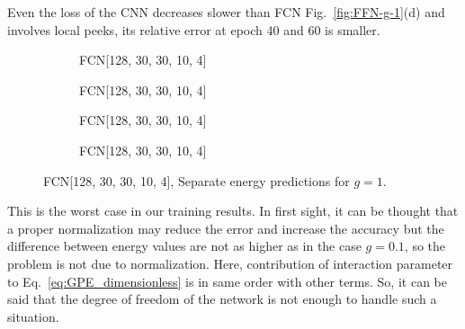 \documentclass[a4paper,times,12pt]{article}
\begin{document}
Even the loss of the CNN decreases slower than FCN Fig.~\ref{fig:FFN-g-1}(d) and involves local peeks, its relative error at epoch 40 and 60 is smaller. 

\begin{figure}[H]
    \centering
    \begin{subfigure}[t]{0.45\textwidth}
		\centering
        
        \caption{FCN[128, 30, 30, 10, 4]}
		\label{fig:a}
    \end{subfigure}
    \begin{subfigure}[t]{0.45\textwidth}
		\centering
        
        \caption{FCN[128, 30, 30, 10, 4]}
		\label{fig:b}
    \end{subfigure}    
    \begin{subfigure}[t]{0.45\textwidth}
        \centering
        
        \caption{FCN[128, 30, 30, 10, 4]}
		\label{fig:c}
    \end{subfigure}
    \begin{subfigure}[t]{0.45\textwidth}
        \centering
        
        \caption{FCN[128, 30, 30, 10, 4]}
		\label{fig:c}
    \end{subfigure}
	\caption{FCN[128, 30, 30, 10, 4], Separate energy predictions for $g = 1$.}
\label{fig:FFN-g-1-S}
\end{figure}

This is the worst case in our training results. In first sight, it can be thought that a proper normalization may reduce the error and increase the accuracy but the difference between energy values are not as higher as in the case $g = 0.1$, so the problem is not due to normalization. Here, contribution of interaction parameter to Eq.~\eqref{eq:GPE_dimensionless} is in same order with other terms. So, it can be said that the degree of freedom of the network is not enough to handle such a situation.
\end{document}
